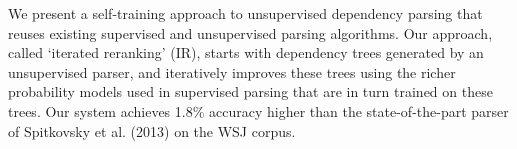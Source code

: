We present a self-training approach to unsupervised dependency parsing that reuses existing supervised and unsupervised parsing algorithms. Our approach, called `iterated reranking' (IR), starts with dependency trees generated by an unsupervised parser, and iteratively improves these trees using the richer probability models used in supervised parsing that are in turn trained on these trees. Our system achieves 1.8\% accuracy higher than the state-of-the-part parser of Spitkovsky et al. (2013) on the WSJ corpus.
